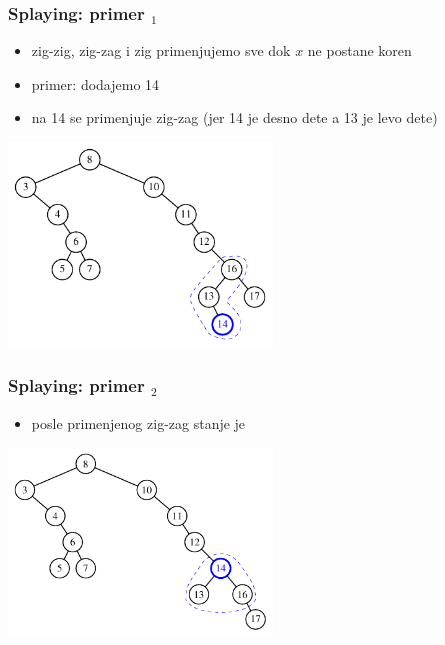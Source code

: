 \documentclass[compress,aspectratio=169]{beamer}
\begin{document}
\begin{frame}[fragile]
  \frametitle{Splaying: primer $_1$}
  \begin{itemize}
    \item zig-zig, zig-zag i zig primenjujemo sve dok $x$ ne postane koren
    \item primer: dodajemo 14
    \item na 14 se primenjuje zig-zag (jer 14 je desno dete a 13 je levo dete)
  \end{itemize}
  \begin{center}
    \includegraphics[width=7cm]{asp-11-pic21.pdf}
  \end{center}
\end{frame}

\begin{frame}[fragile]
  \frametitle{Splaying: primer $_2$}
  \begin{itemize}
    \item posle primenjenog zig-zag stanje je
  \end{itemize}
  \begin{center}
    \includegraphics[width=7cm]{asp-11-pic22.pdf}
  \end{center}
\end{frame}
\end{document}

